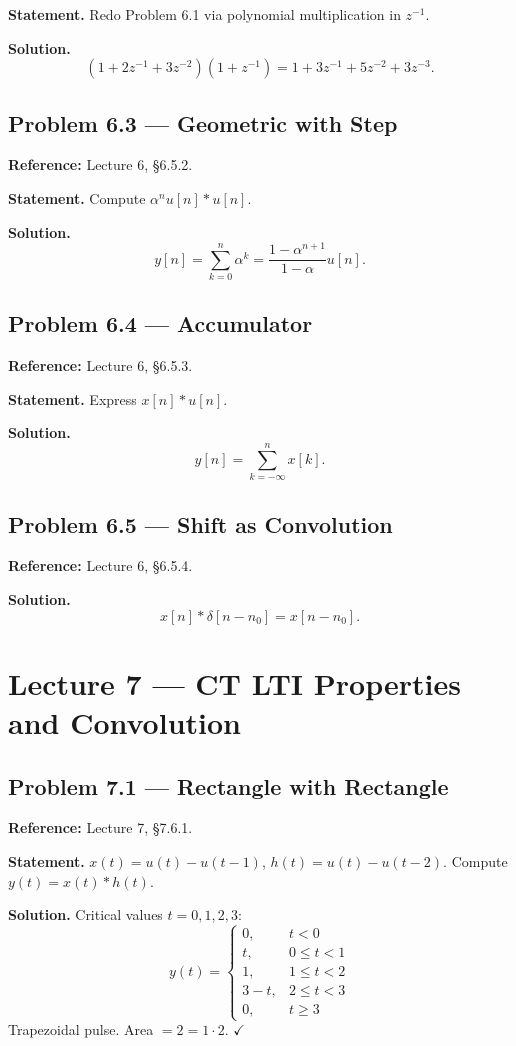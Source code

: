 \documentclass[11pt]{article}
\newcommand{\Conv}{\ast}
\begin{document}
\textbf{Statement.} Redo Problem 6.1 via polynomial multiplication in $z^{-1}$.

\textbf{Solution.}
\[
(1+2z^{-1}+3z^{-2})(1+z^{-1}) = 1+3z^{-1}+5z^{-2}+3z^{-3}.
\]

\subsection{Problem 6.3 --- Geometric with Step}
\textbf{Reference:} Lecture 6, \S 6.5.2.

\textbf{Statement.} Compute $\alpha^n u[n]\Conv u[n]$.

\textbf{Solution.}
\[
y[n] = \sum_{k=0}^n \alpha^k = \frac{1-\alpha^{n+1}}{1-\alpha}u[n].
\]

\subsection{Problem 6.4 --- Accumulator}
\textbf{Reference:} Lecture 6, \S 6.5.3.

\textbf{Statement.} Express $x[n]\Conv u[n]$.

\textbf{Solution.}
\[
y[n] = \sum_{k=-\infty}^n x[k].
\]

\subsection{Problem 6.5 --- Shift as Convolution}
\textbf{Reference:} Lecture 6, \S 6.5.4.

\textbf{Solution.}
\[
x[n]\Conv \delta[n-n_0] = x[n-n_0].
\]

\section{Lecture 7 --- CT LTI Properties and Convolution}

\subsection{Problem 7.1 --- Rectangle with Rectangle}
\textbf{Reference:} Lecture 7, \S 7.6.1.

\textbf{Statement.} $x(t)=u(t)-u(t-1)$, $h(t)=u(t)-u(t-2)$. Compute $y(t)=x(t)\Conv h(t)$.

\textbf{Solution.} Critical values $t=0,1,2,3$:
\[
y(t)=\begin{cases}
0, & t<0\\
t, & 0\le t<1\\
1, & 1\le t<2\\
3-t, & 2\le t<3\\
0, & t\ge 3
\end{cases}
\]
Trapezoidal pulse. Area $=2=1\cdot 2$. $\checkmark$
\end{document}
